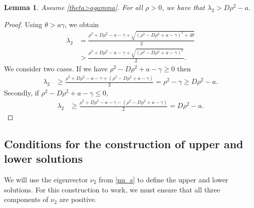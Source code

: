 \documentclass[11pt]{article}
\newtheorem{lemma}[thm]{Lemma}
\theoremstyle{definition}
\begin{document}
\begin{lemma} \label{estimate_lambda_lemma}
  Assume \eqref{theta>agamma}.  For all $\rho>0$, we have that $\lambda_2 > D \rho^2-a$.
    \end{lemma}
    \begin{proof} Using $\theta>a \gamma$, we obtain
        \begin{align}
            \lambda_2&=  \frac{\rho^2+D \rho^2-a- \gamma +\sqrt{(\rho^2- D \rho^2+a- \gamma)^2+ 4 \theta}}{2}\\& >  \frac{\rho^2+D \rho^2-a- \gamma + \sqrt{(\rho^2- D \rho^2+a- \gamma)^2}}{2}.
        \end{align}
    We consider two cases. If we have $\rho^2 - D  \rho^2+a- \gamma \geq 0$ then  
    \begin{align}
        \lambda_2 & \geq  \frac{\rho^2+D \rho^2-a- \gamma + {(\rho^2- D \rho^2+a- \gamma)}}{2} = \rho^2- \gamma \geq D \rho^2 -a.
    \end{align} 
    Secondly, if $\rho^2 - D  \rho^2+a- \gamma \leq0$, 
    \begin{align}
        \lambda_2 & \geq  \frac{\rho^2+D \rho^2-a- \gamma - {(\rho^2- D \rho^2+a- \gamma)}}{2} =  D \rho^2 -a.
    \end{align}
    \end{proof}


\subsection{Conditions for the construction of upper and lower solutions} 
We will use the eigenvector $\nu_2$ from \eqref{nu_s} to define the upper and lower solutions. For this construction to work, we must ensure that all three components of $\nu_2$ are positive.
\end{document}
